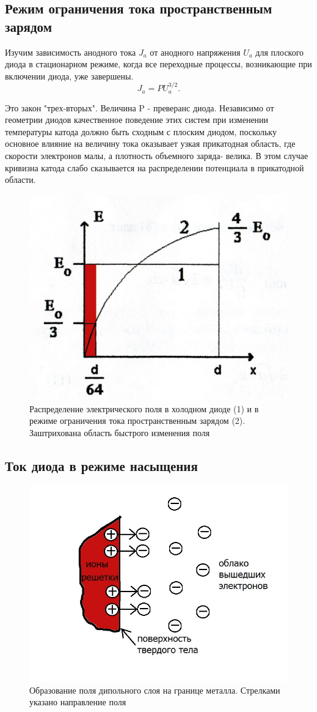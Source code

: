 \subsection{Режим ограничения тока пространственным зарядом}
Изучим зависимость анодного тока $J_a$ от анодного напряжения $U_a$ для плоского диода в стационарном режиме, когда все переходные процессы, возникающие при включении диода, уже завершены. 
\begin{equation}
	J_a=PU_a^{3/2}.
\end{equation}

Это закон "трех-вторых". Величина P - преверанс диода. Независимо от геометрии  диодов качественное поведение этих систем при изменении температуры катода должно быть сходным с плоским диодом, поскольку основное влияние на величину тока оказывает узкая прикатодная область, где скорости электронов малы, а плотность объемного заряда- велика. В этом случае кривизна катода слабо сказывается на распределении потенциала в прикатодной области.

\begin{figure}[h!]
	\centering
	\includegraphics[width=0.5\linewidth]{fig/img8072.jpg}
	\caption{Распределение электрического поля в холодном диоде (1) и в режиме ограничения тока пространственным зарядом (2). Заштрихована область быстрого изменения поля}
	\label{fig:4}
\end{figure}

\subsection{Ток диода в режиме насыщения}

\begin{figure}[h!]
	\centering
	\includegraphics[width=0.5\linewidth]{fig/img80825.jpg}
	\caption{Образование поля дипольного слоя на границе металла. Стрелками указано направление поля}
	\label{fig:5}
\end{figure}

